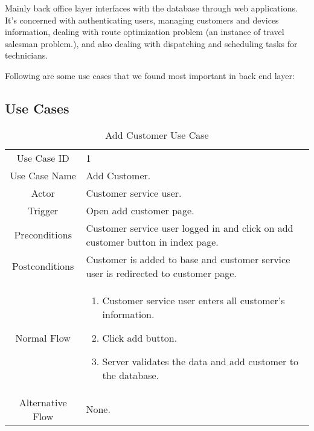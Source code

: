 Mainly back office layer interfaces with the database through web applications. It's concerned with authenticating users, managing customers and devices information, dealing with route optimization problem (an instance of travel salesman problem.), and also dealing with dispatching and scheduling tasks for technicians.

Following are some use cases that we found most important in back end layer:
\subsection{Use Cases}
	\begin{table}[H]
		\centering
		\renewcommand{\arraystretch}{1.5}
		\begin{tabular}[t]{ c  m{10cm} }
			Use Case ID & 1  \\
			Use Case Name & Add Customer. \\
			Actor & Customer service user. \\
			Trigger & Open add customer page. \\
			Preconditions & Customer service user logged in and click on add customer button in index page. \\
			Postconditions & Customer is added to base and customer service user is redirected to customer page. \\
			Normal Flow &\begin{enumerate}
				\item Customer service user enters all customer's information.
				\item Click add button.
				\item Server validates the data and add customer to the database.
			\end{enumerate}\\
			Alternative Flow & None. \\
		\end{tabular}
		\caption{Add Customer Use Case}
		\renewcommand{\arraystretch}{1.0}
	\end{table}
	
